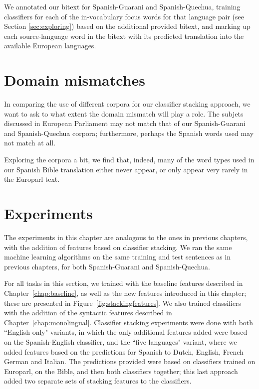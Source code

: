 
We annotated our bitext for Spanish-Guarani and Spanish-Quechua,
training classifiers for each of the in-vocabulary focus words for that
language pair (see Section \ref{sec:exploring}) based on the additional
provided bitext, and marking up each source-language word in the bitext with
its predicted translation into the available European languages.

\section{Domain mismatches}

In comparing the use of different corpora for our classifier stacking approach,
we want to ask to what extent the domain mismatch will play a role.
The subjets discussed in European Parliament may not match that of our
Spanish-Guarani and Spanish-Quechua corpora; furthermore, perhaps the Spanish
words used may not match at all.

Exploring the corpora a bit, we find that, indeed, many of the word types used
in our Spanish Bible translation either never appear, or only appear very
rarely in the Europarl text.

\section{Experiments}
\label{sec:multilingual-experiments}

The experiments in this chapter are analogous to the ones in previous chapters,
with the addition of features based on classifier stacking. We ran the same
machine learning algorithms on the same training and test sentences as in
previous chapters, for both Spanish-Guarani and Spanish-Quechua.

For all tasks in this section, we trained with the baseline features described
in Chapter~\ref{chap:baseline}, as well as the new features introduced in this
chapter; these are presented in Figure~\ref{fig:stackingfeatures}.  We also
trained classifiers with the addition of the syntactic features described in
Chapter~\ref{chap:monolingual}. Classifier stacking experiments were done with
both ``English only" variants, in which the only additional features added were
based on the Spanish-English classifier, and the ``five languages" variant,
where we added features based on the predictions for Spanish to Dutch, English,
French German and Italian. The predictions provided were based on classifiers
trained on Europarl, on the Bible, and then both classifiers together; this
last approach added two separate sets of stacking features to the classifiers.

